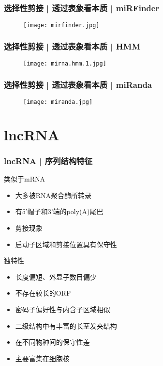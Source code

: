 \begin{frame}
  \frametitle{选择性剪接 | 透过表象看本质 | miRFinder}
  \begin{figure}
    \centering
    \texttt{[image: mirfinder.jpg]}
  \end{figure}
\end{frame}

\begin{frame}
  \frametitle{选择性剪接 | 透过表象看本质 | HMM}
  \begin{figure}
    \centering
    \texttt{[image: mirna.hmm.1.jpg]}
  \end{figure}
\end{frame}

\begin{frame}
  \frametitle{选择性剪接 | 透过表象看本质 | miRanda}
  \begin{figure}
    \centering
    \texttt{[image: miranda.jpg]}
  \end{figure}
\end{frame}

\section{lncRNA}
\begin{frame}
  \frametitle{lncRNA | 序列结构特征}
  \begin{block}{类似于mRNA}
    \begin{itemize}
      \item 大多被RNA聚合酶所转录
      \item 有5'帽子和3'端的poly(A)尾巴
      \item 剪接现象
      \item 启动子区域和剪接位置具有保守性
    \end{itemize}
  \end{block}
  \pause
  \begin{block}{独特性}
  \begin{itemize}
    \item 长度偏短、外显子数目偏少
    \item 不存在较长的ORF
    \item 密码子偏好性与内含子区域相似
    \item 二级结构中有丰富的长茎发夹结构
    \item 在不同物种间的保守性差
    \item 主要富集在细胞核
  \end{itemize}
  \end{block}
\end{frame}

